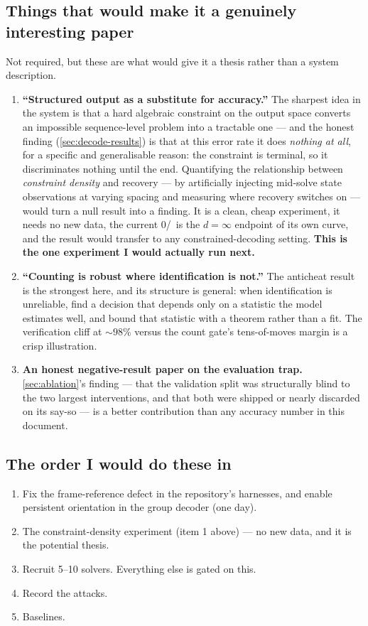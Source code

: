 \subsection{Things that would make it a genuinely interesting paper}

Not required, but these are what would give it a thesis rather than a
system description.

\begin{enumerate}[leftmargin=1.4em,itemsep=4pt]
\item \textbf{``Structured output as a substitute for accuracy.''} The
sharpest idea in the system is that a hard algebraic constraint on the output
space converts an impossible sequence-level problem into a tractable one ---
and the honest finding (\cref{sec:decode-results}) is that at this error
rate it does \emph{nothing at all}, for a specific and generalisable reason:
the constraint is terminal, so it discriminates nothing until the end.
Quantifying the relationship between \emph{constraint density} and recovery
--- by artificially injecting mid-solve state observations at varying spacing
and measuring where recovery switches on --- would turn a null result into a
finding. It is a clean, cheap experiment, it needs no new data, the current
0/\DecodeTrials\ is the $d=\infty$ endpoint of its own curve, and the result
would transfer to any constrained-decoding setting. \textbf{This is the one
experiment I would actually run next.}
\item \textbf{``Counting is robust where identification is not.''} The
anticheat result is the strongest here, and its structure is general: when
identification is unreliable, find a decision that depends only on a
statistic the model estimates well, and bound that statistic with a theorem
rather than a fit. The verification cliff at ${\sim}98\%$ versus the count
gate's tens-of-moves margin is a crisp illustration.
\item \textbf{An honest negative-result paper on the evaluation trap.}
\cref{sec:ablation}'s finding --- that the validation split was structurally
blind to the two largest interventions, and that both were shipped or nearly
discarded on its say-so --- is a better contribution than any accuracy
number in this document.
\end{enumerate}

\subsection{The order I would do these in}

\begin{enumerate}[leftmargin=1.4em,itemsep=2pt]
\item Fix the frame-reference defect in the repository's harnesses, and
enable persistent orientation in the group decoder (one day).
\item The constraint-density experiment (item 1 above) --- no new data, and
it is the potential thesis.
\item Recruit 5--10 solvers. Everything else is gated on this.
\item Record the attacks.
\item Baselines.
\end{enumerate}

